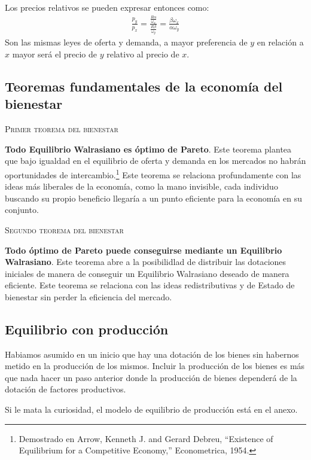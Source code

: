 Los precios relativos se pueden expresar entonces como:
\begin{align*}
    \frac{p_y}{p_x} = \frac{ \frac{R\alpha}{\omega_x}  }{  \frac{R\beta}{\omega_y}  } = \frac{\beta \omega_x}{\alpha \omega_y}
\end{align*}
Son las mismas leyes de oferta y demanda, a mayor preferencia de $y$ en relación a $x$ mayor será el precio de $y$ relativo al precio de $x$. 

\subsection{Teoremas fundamentales de la economía del bienestar}

\textsc{Primer teorema del bienestar} 

\textbf{Todo Equilibrio Walrasiano es óptimo de Pareto}. Este teorema plantea que bajo igualdad en el equilibrio de oferta y demanda en los mercados no habrán oportunidades de intercambio.\footnote{Demostrado en Arrow, Kenneth J. and Gerard Debreu, “Existence of Equilibrium for a Competitive Economy,” Econometrica, 1954.} Este teorema se relaciona profundamente con las ideas más liberales de la economía, como la mano invisible, cada individuo buscando su propio beneficio llegaría a un punto eficiente para la economía en su conjunto. 

\textsc{Segundo teorema del bienestar} 

\textbf{Todo óptimo de Pareto puede conseguirse mediante un Equilibrio Walrasiano}. Este teorema abre a la posibilidlad de distribuir las dotaciones iniciales de manera de conseguir un Equilibrio Walrasiano deseado de manera eficiente. Este teorema se relaciona con las ideas redistributivas y de Estado de bienestar sin perder la eficiencia del mercado. 

\subsection{Equilibrio con producción}

Habiamos asumido en un inicio que hay una dotación de los bienes sin habernos metido en la producción de los mismos. Incluir la producción de los bienes es más que nada hacer un paso anterior donde la producción de bienes dependerá de la dotación de factores productivos.

Si le mata la curiosidad, el modelo de equilibrio de producción está en el anexo.

